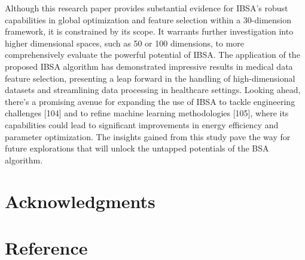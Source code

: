 \documentclass{article} %
\begin{document}
Although this research paper provides substantial evidence for IBSA's robust capabilities in global optimization and feature selection within a 30-dimension framework, it is constrained by its scope. It warrants further investigation into higher dimensional spaces, such as 50 or 100 dimensions, to more comprehensively evaluate the powerful potential of IBSA. The application of the proposed IBSA algorithm has demonstrated impressive results in medical data feature selection, presenting a leap forward in the handling of high-dimensional datasets and streamlining data processing in healthcare settings. Looking ahead, there's a promising avenue for expanding the use of IBSA to tackle engineering challenges [104] and to refine machine learning methodologies [105], where its capabilities could lead to significant improvements in energy efficiency and parameter optimization. The insights gained from this study pave the way for future explorations that will unlock the untapped potentials of the BSA algorithm.

\noindent 
\section{Acknowledgments}

\noindent 
\section{Reference}

\noindent 

\noindent 
\end{document}
